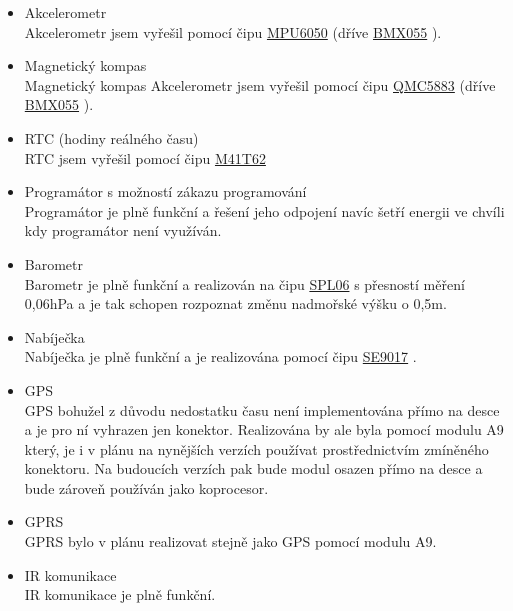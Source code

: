 \begin{itemize}
    \item Akcelerometr \\ Akcelerometr jsem vyřešil pomocí čipu \href{https://datasheet.lcsc.com/szlcsc/TDK-InvenSense-MPU-6050_C24112.pdf}{MPU6050} (dříve \href{https://datasheet.lcsc.com/szlcsc/Bosch-Sensortec-BMX055_C94022.pdf}{BMX055} \parencite{bmx055}).
    \item Magnetický kompas \\ Magnetický kompas Akcelerometr jsem vyřešil pomocí čipu \href{https://datasheet.lcsc.com/szlcsc/QST-QMC5883L-TR_C192585.pdf}{QMC5883} \parencite{qmc5883} (dříve \href{https://datasheet.lcsc.com/szlcsc/Bosch-Sensortec-BMX055_C94022.pdf}{BMX055} \parencite{bmx055}).
    \item RTC (hodiny reálného času) \\ RTC jsem vyřešil pomocí čipu \href{https://datasheet.lcsc.com/szlcsc/STMicroelectronics-M41T62Q6F_C113207.pdf}{M41T62} \parencite{m41t62} 
    \item Programátor s možností zákazu programování \\ Programátor je plně funkční a řešení jeho odpojení navíc šetří energii ve chvíli kdy programátor není využíván.
    \item Barometr \\ Barometr je plně funkční a realizován na čipu \href{https://datasheet.lcsc.com/szlcsc/1907081118_Goertek-SPL06-007_C233787.pdf}{SPL06} s přesností měření 
            0,06hPa a je tak schopen rozpoznat změnu nadmořské výšku o 0,5m.
    \item Nabíječka \\ Nabíječka je plně funkční a je realizována pomocí čipu \href{https://datasheet.lcsc.com/szlcsc/Seaward-Elec-SE9017-HF_C115752.pdf}{SE9017} \parencite{se9017}.
    \item GPS \\ GPS bohužel z důvodu nedostatku času není implementována přímo na desce a je pro ní vyhrazen jen konektor. Realizována by ale byla pomocí modulu A9 který, 
            je i v plánu na nynějších verzích používat prostřednictvím zmíněného konektoru. Na budoucích verzích pak bude modul osazen přímo na desce a bude zároveň používán jako koprocesor.
    \item GPRS \\ GPRS bylo v plánu realizovat stejně jako GPS pomocí modulu A9.
    \item IR komunikace \\ IR komunikace je plně funkční.
\end{itemize}


